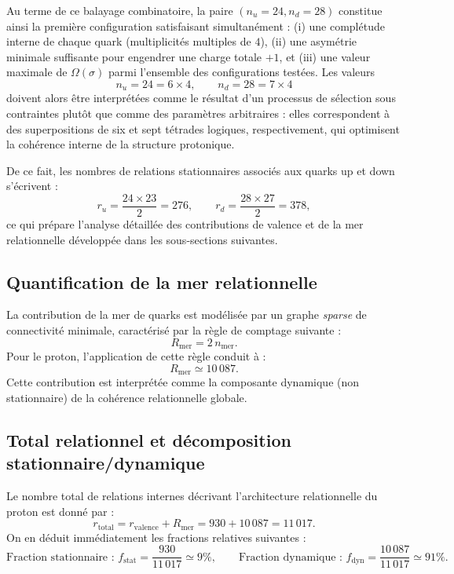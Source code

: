 \documentclass[11pt,a4paper]{article}
\begin{document}
Au terme de ce balayage combinatoire, la paire \(\left(n_u=24,n_d=28\right)\) constitue ainsi la première configuration satisfaisant simultanément : (i) une complétude interne de chaque quark (multiplicités multiples de \(4\)), (ii) une asymétrie minimale suffisante pour engendrer une charge totale \(+1\), et (iii) une valeur maximale de \(\Omega\left(\sigma\right)\) parmi l’ensemble des configurations testées. Les valeurs
\[
n_u = 24 = 6\times 4,\qquad
n_d = 28 = 7\times 4
\]
doivent alors être interprétées comme le résultat d’un processus de sélection sous contraintes plutôt que comme des paramètres arbitraires : elles correspondent à des superpositions de six et sept tétrades logiques, respectivement, qui optimisent la cohérence interne de la structure protonique.

De ce fait, les nombres de relations stationnaires associés aux quarks up et down s’écrivent :
\[
r_u = \frac{24\times 23}{2} = 276,\qquad
r_d = \frac{28\times 27}{2} = 378,
\]
ce qui prépare l’analyse détaillée des contributions de valence et de la mer relationnelle développée dans les sous-sections suivantes.

\subsection{Quantification de la mer relationnelle}

La contribution de la mer de quarks est modélisée par un graphe \emph{sparse} de connectivité minimale, caractérisé par la règle de comptage suivante :
\[
R_{\mathrm{mer}} = 2\, n_{\mathrm{mer}}.
\]
Pour le proton, l’application de cette règle conduit à :
\[
R_{\mathrm{mer}} \simeq 10\,087.
\]
Cette contribution est interprétée comme la composante dynamique (non stationnaire) de la cohérence relationnelle globale.

\subsection{Total relationnel et décomposition stationnaire/dynamique}

Le nombre total de relations internes décrivant l’architecture relationnelle du proton est donné par :
\[
r_{\mathrm{total}} = r_{\mathrm{valence}} + R_{\mathrm{mer}} = 930 + 10\,087 = 11\,017.
\]
On en déduit immédiatement les fractions relatives suivantes :
\[
\text{Fraction stationnaire : } f_{\mathrm{stat}} = \frac{930}{11\,017} \simeq 9\%\!,
\qquad
\text{Fraction dynamique : } f_{\mathrm{dyn}} = \frac{10\,087}{11\,017} \simeq 91\%\!.
\]
\end{document}
